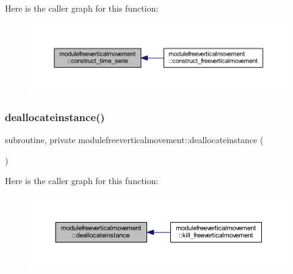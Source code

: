 Here is the caller graph for this function\+:\nopagebreak
\begin{figure}[H]
\begin{center}
\leavevmode
\includegraphics[width=350pt]{namespacemodulefreeverticalmovement_a2ca295c9f72cbcb4ce9b0d893235eca0_icgraph}
\end{center}
\end{figure}
\mbox{\label{namespacemodulefreeverticalmovement_a336eabf740dc9afccbeae27f1bd4c8f4}} 
\subsubsection{\texorpdfstring{deallocateinstance()}{deallocateinstance()}}
{\footnotesize\ttfamily subroutine, private modulefreeverticalmovement\+::deallocateinstance (\begin{DoxyParamCaption}{ }\end{DoxyParamCaption})\hspace{0.3cm}{\ttfamily [private]}}

Here is the caller graph for this function\+:\nopagebreak
\begin{figure}[H]
\begin{center}
\leavevmode
\includegraphics[width=350pt]{namespacemodulefreeverticalmovement_a336eabf740dc9afccbeae27f1bd4c8f4_icgraph}
\end{center}
\end{figure}
\mbox{\label{namespacemodulefreeverticalmovement_ac736b639239aa370175df19fc8836c97}} 
